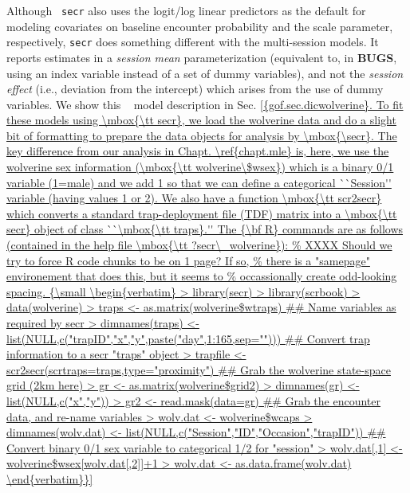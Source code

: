 Although \mbox{\tt
  secr} also uses the logit/log linear predictors as the default for
modeling covariates on baseline encounter probability and the scale
parameter, respectively, \mbox{\tt secr} does something different with
the multi-session models. It reports estimates in a {\it session mean}
parameterization (equivalent to, in {\bf BUGS}, using an index
variable instead of a set of dummy variables), and not the {\it
  session effect} (i.e., deviation from the intercept) which arises
from the use of dummy variables.  We show this \bugs~ model description 
in Sec. \ref{{gof.sec.dicwolverine}. 


To fit these models using \mbox{\tt secr}, 
we load the wolverine data and do 
a slight bit of formatting to prepare the data objects for analysis by
\mbox{\secr}. The key difference from our analysis in
Chapt. \ref{chapt.mle} is, here, we use the wolverine sex information
(\mbox{\tt wolverine\$wsex}) which is a binary 0/1 variable (1=male) 
and we add
1 so that we can define a categorical  ``Session'' variable (having
values 1 or 2). We also have a function \mbox{\tt scr2secr} which
converts a standard trap-deployment file (TDF) matrix into a \mbox{\tt secr}
object of class ``\mbox{\tt traps}.''
The {\bf R} commands are as follows (contained in the help file
\mbox{\tt ?secr\_wolverine}): 
{\small
\begin{verbatim}

> library(secr)
> library(scrbook)
> data(wolverine)
> traps <- as.matrix(wolverine$wtraps)

## Name variables as required by secr
> dimnames(traps) <- list(NULL,c("trapID","x","y",paste("day",1:165,sep="")))
## Convert trap information to a secr "traps" object
> trapfile <- scr2secr(scrtraps=traps,type="proximity")

## Grab the wolverine state-space grid (2km here)
> gr <- as.matrix(wolverine$grid2)
> dimnames(gr) <- list(NULL,c("x","y"))
> gr2 <- read.mask(data=gr)

## Grab the encounter data, and re-name variables
> wolv.dat <- wolverine$wcaps
> dimnames(wolv.dat) <- list(NULL,c("Session","ID","Occasion","trapID"))

## Convert binary 0/1 sex variable to categorical 1/2 for "session"
> wolv.dat[,1] <- wolverine$wsex[wolv.dat[,2]]+1
> wolv.dat <- as.data.frame(wolv.dat)


\end{verbatim}}}
